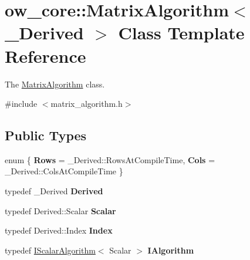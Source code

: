 \hypertarget{classow__core_1_1MatrixAlgorithm}{}\section{ow\+\_\+core\+:\+:Matrix\+Algorithm$<$ \+\_\+\+Derived $>$ Class Template Reference}
\label{classow__core_1_1MatrixAlgorithm}


The \hyperlink{classow__core_1_1MatrixAlgorithm}{Matrix\+Algorithm} class.  




{\ttfamily \#include $<$matrix\+\_\+algorithm.\+h$>$}

\subsection*{Public Types}
\begin{DoxyCompactItemize}
\item 
enum \{ {\bfseries Rows} = \+\_\+\+Derived\+:\+:Rows\+At\+Compile\+Time, 
{\bfseries Cols} = \+\_\+\+Derived\+:\+:Cols\+At\+Compile\+Time
 \}\hypertarget{classow__core_1_1MatrixAlgorithm_a2d92c0fcaa8e371d1c1b96208b8adce1}{}\label{classow__core_1_1MatrixAlgorithm_a2d92c0fcaa8e371d1c1b96208b8adce1}

\item 
typedef \+\_\+\+Derived {\bfseries Derived}\hypertarget{classow__core_1_1MatrixAlgorithm_a3e269ceba99918b9d7f1bf2ccfbc40f9}{}\label{classow__core_1_1MatrixAlgorithm_a3e269ceba99918b9d7f1bf2ccfbc40f9}

\item 
typedef Derived\+::\+Scalar {\bfseries Scalar}\hypertarget{classow__core_1_1MatrixAlgorithm_a5d3d7ba1df891c76d963ce3ba6d0dd69}{}\label{classow__core_1_1MatrixAlgorithm_a5d3d7ba1df891c76d963ce3ba6d0dd69}

\item 
typedef Derived\+::\+Index {\bfseries Index}\hypertarget{classow__core_1_1MatrixAlgorithm_a9db9181f15e6d15bf65ccf2414f1f50e}{}\label{classow__core_1_1MatrixAlgorithm_a9db9181f15e6d15bf65ccf2414f1f50e}

\item 
typedef \hyperlink{classow__core_1_1IScalarAlgorithm}{I\+Scalar\+Algorithm}$<$ Scalar $>$ {\bfseries I\+Algorithm}\hypertarget{classow__core_1_1MatrixAlgorithm_a5cad17788a0f278b4180b1564203d458}{}\label{classow__core_1_1MatrixAlgorithm_a5cad17788a0f278b4180b1564203d458}

\end{DoxyCompactItemize}
